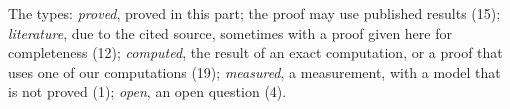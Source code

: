 The types: \emph{proved}, proved in this part; the proof may use published results (15); \emph{literature}, due to the cited source, sometimes with a proof given here for completeness (12); \emph{computed}, the result of an exact computation, or a proof that uses one of our computations (19); \emph{measured}, a measurement, with a model that is not proved (1); \emph{open}, an open question (4).
